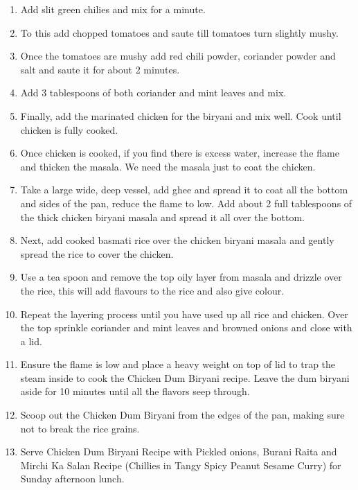 \documentclass{article}
\begin{document}
\begin{enumerate}
            \item Add slit green chilies and mix for a minute.
            
            \item To this add chopped tomatoes and saute till tomatoes turn slightly mushy.
            
            \item Once the tomatoes are mushy add red chili powder, coriander powder and salt and saute it for about 2 minutes.
            
            \item Add 3 tablespoons of both coriander and mint leaves and mix.
            
            \item Finally, add  the marinated chicken for the biryani and mix well. Cook until chicken is fully cooked. 
            
            \item Once chicken is cooked, if you find there is excess water, increase the flame and thicken the masala. We need the masala just to coat the chicken.
            
            \item Take a large wide, deep vessel, add ghee and spread it to coat all the bottom and sides of the pan, reduce the flame to low. Add about 2 full tablespoons of the thick chicken biryani masala and spread it all over the bottom.
            
            \item Next, add cooked basmati rice over the chicken biryani masala and gently spread the rice to cover the chicken. 
            
            \item Use a tea spoon and remove the top oily layer from masala and drizzle over the rice, this will add flavours to the rice and also give colour.
            
            \item Repeat the layering process until you have used up all rice and chicken. Over the top sprinkle coriander and mint leaves and browned onions and close with a lid.
            
            \item Ensure the flame is low and place a heavy weight on top of lid to trap the steam inside to cook the Chicken Dum Biryani recipe. Leave the dum biryani aside for 10 minutes until all the flavors seep through.
            
            \item Scoop out the Chicken Dum Biryani from the edges of the pan, making sure not to break the rice grains.
            
            \item Serve Chicken Dum Biryani Recipe with Pickled onions, Burani Raita and Mirchi Ka Salan Recipe (Chillies in Tangy Spicy Peanut Sesame Curry) for Sunday afternoon lunch.
        \end{enumerate}
    
       
\end{document}
